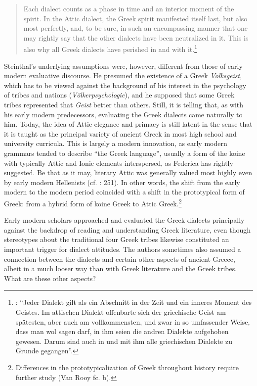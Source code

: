 \documentclass[output=paper]{langsci/langscibook}
\begin{document}
\begin{quote}
Each dialect counts as a phase in time and an interior moment of the spirit. In the Attic dialect, the Greek spirit manifested itself last, but also most perfectly, and, to be sure, in such an encompassing manner that one may rightly say that the other dialects have been neutralized in it. This is also why all Greek dialects have perished in and with it.\footnote{\citet[9]{Steinthal1891}: “Jeder Dialekt gilt als ein Abschnitt in der Zeit und ein inneres Moment des Geistes. Im attischen Dialekt offenbarte sich der griechische Geist am spätesten, aber auch am vollkommensten, und zwar in so umfassender Weise, dass man wol sagen darf, in ihm seien die andren Dialekte aufgehoben gewesen. Darum sind auch in und mit ihm alle griechischen Dialekte zu Grunde gegangen”.}
\end{quote}

Steinthal’s underlying assumptions were, however, different from those of early modern evaluative discourse. He presumed the existence of a Greek \textit{Volksgeist}, which has to be viewed against the background of his interest in the psychology of tribes and nations (\textit{Völkerpsychologie}), and he supposed that some Greek tribes represented that \textit{Geist} better than others. Still, it is telling that, as with his early modern predecessors, evaluating the Greek dialects came naturally to him. Today, the idea of Attic elegance and primacy is still latent in the sense that it is taught as the principal variety of ancient Greek in most high school and university curricula. This is largely a modern innovation, as early modern grammars tended to describe “the Greek language”, usually a form of the koine with typically Attic and Ionic elements interspersed, as Federica \citet[123]{Ciccolella2008} has rightly suggested. Be that as it may, literary Attic was generally valued most highly even by early modern Hellenists (cf. \citealt{Roelcke2014}: 251). In other words, the shift from the early modern to the modern period coincided with a shift in the prototypical form of Greek: from a hybrid form of koine Greek to Attic Greek.\footnote{Differences in the prototypicalization of Greek throughout history require further study (Van Rooy fc. b).}

Early modern scholars approached and evaluated the Greek dialects principally against the backdrop of reading and understanding Greek literature, even though stereotypes about the traditional four Greek tribes likewise constituted an important trigger for dialect attitudes. The authors sometimes also assumed a connection between the dialects and certain other aspects of ancient Greece, albeit in a much looser way than with Greek literature and the Greek tribes. What are these other aspects?
\end{document}
